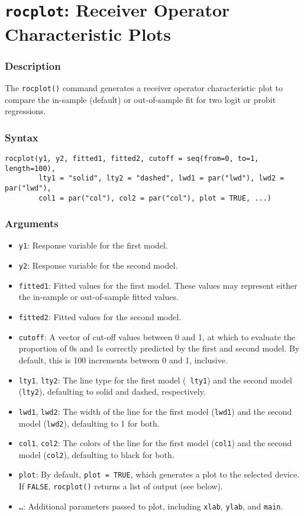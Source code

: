 \section{{\tt rocplot}: Receiver Operator Characteristic Plots}\label{ss:rocplot}

\subsubsection{Description}
The \texttt{rocplot()} command generates a receiver operator
characteristic plot to compare the in-sample (default) or
out-of-sample fit for two logit or probit regressions.  

\subsubsection{Syntax}
\begin{verbatim}
rocplot(y1, y2, fitted1, fitted2, cutoff = seq(from=0, to=1, length=100), 
        lty1 = "solid", lty2 = "dashed", lwd1 = par("lwd"), lwd2 = par("lwd"),
        col1 = par("col"), col2 = par("col"), plot = TRUE, ...)
\end{verbatim}

\subsubsection{Arguments}
\begin{itemize}
\item {\tt y1}: Response variable for the first model.  
\item {\tt y2}: Response variable for the second model. 
\item {\tt fitted1}: Fitted values for the first model.  These values
  may represent either the in-sample or out-of-sample fitted values.
\item {\tt fitted2}: Fitted values for the second model.  
\item {\tt cutoff}: A vector of cut-off values between 0 and 1, at
  which to evaluate the proportion of 0s and 1s correctly predicted by
  the first and second model.  By default, this is 100 increments
  between 0 and 1, inclusive.  
\item {\tt lty1}, {\tt lty2}: The line type for the first model ({\tt
    lty1}) and the second model ({\tt lty2}), defaulting to solid and
  dashed, respectively.    
\item {\tt lwd1}, {\tt lwd2}: The width of the line for the first
  model ({\tt lwd1}) and the second model ({\tt lwd2}), defaulting to
  1 for both.  
\item {\tt col1}, {\tt col2}: The colors of the line for the first
  model ({\tt col1}) and the second model ({\tt col2}), defaulting to
  black for both.
\item{\tt plot}: By default, {\tt plot = TRUE}, which generates a plot to the
  selected device.  If {\tt FALSE}, {\tt rocplot()} returns a list of output (see below).  
\item {\tt \dots}: Additional parameters passed to plot, including
  {\tt xlab}, {\tt ylab}, and {\tt main}.  
\end{itemize}

